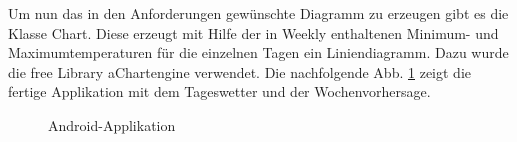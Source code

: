   Um nun das in den Anforderungen gewünschte Diagramm zu erzeugen gibt es die Klasse Chart. Diese erzeugt mit Hilfe der in Weekly enthaltenen Minimum- und Maximumtemperaturen für die einzelnen Tagen ein Liniendiagramm. Dazu wurde die free Library aChartengine verwendet.
Die nachfolgende Abb. \ref{img:AndroidApplikation} zeigt die fertige Applikation mit dem Tageswetter und der Wochenvorhersage.

\begin{figure}
\caption{Android-Applikation}
\label{img:AndroidApplikation}
\end{figure}


